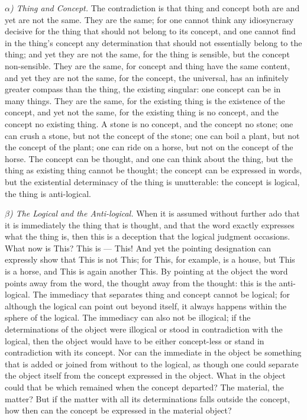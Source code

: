 \documentclass[12pt]{book}
\begin{document}
\emph{$\alpha$) Thing and Concept.} The contradiction is that thing and concept
both are and yet are not the same. They are the same; for one cannot think any
idiosyncrasy decisive for the thing that should not belong to its concept, and
one cannot find in the thing's concept any determination that should not
essentially belong to the thing; and yet they are not the same, for the thing is
sensible, but the concept non-sensible. They are the same, for concept and thing
have the same content, and yet they are not the same, for the concept, the
universal, has an infinitely greater compass than the thing, the existing
singular: one concept can be in many things. They are the same, for the existing
thing is the existence of the concept, and yet not the same, for the existing
thing is no concept, and the concept no existing thing. A stone is no concept, and
the concept no stone; one can crush a stone, but not the concept of the stone; one
can boil a plant, but not the concept of the plant; one can ride on a horse, but
not on the concept of the horse. The concept can be thought, and one can think
about the thing, but the thing as existing thing cannot be thought; the concept
can be expressed in words, but the existential determinacy of the thing is
unutterable: the concept is logical, the thing is anti-logical.

\emph{$\beta$) The Logical and the Anti-logical.} When it is assumed without
further ado that it is immediately the thing that is thought, and that the word
exactly expresses what the thing is, then this is a deception that the logical
judgment occasions. What now is This? This is --- This! And yet the pointing
designation can expressly show that This is not This; for This, for example, is a
house, but This is a horse, and This is again another This. By pointing at the
object the word points away from the word, the thought away from the thought:
this is the anti-logical. The immediacy that separates thing and concept cannot be
logical; for although the logical can point out beyond itself, it always happens
within the sphere of the logical. The immediacy can also not be illogical; if the
determinations of the object were illogical or stood in contradiction with the
logical, then the object would have to be either concept-less or stand in
contradiction with its concept. Nor can the immediate in the object be something
that is added or joined from without to the logical, as though one could separate
the object itself from the concept expressed in the object. What in the object
could that be which remained when the concept departed? The material, the matter?
But if the matter with all its determinations falls outside the concept, how then
can the concept be expressed in the material object?
\end{document}
